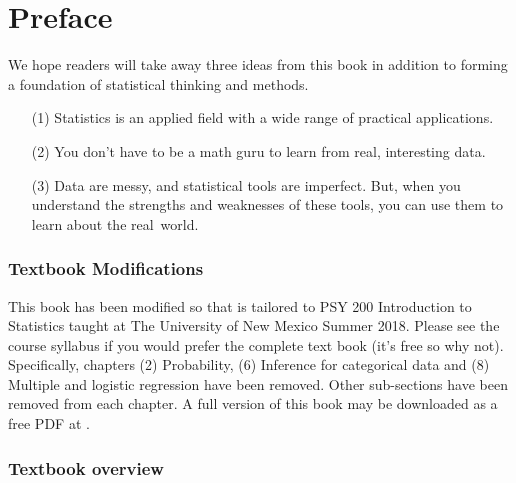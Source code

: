 \chapter*{Preface}

\noindent We hope readers will take away three ideas from this book in addition to forming a foundation of statistical thinking and methods.\vspace{-1mm}
\begin{enumerate}
\setlength{\itemsep}{0mm}
\item[(1)] Statistics is an applied field with a wide range of practical applications.
\item[(2)] You don't have to be a math guru to learn from real, interesting data.
\item[(3)] Data are messy, and statistical tools are imperfect. But, when you understand the strengths and weaknesses of these tools, you can use them to learn about the real~world.
\end{enumerate}

\subsection*{Textbook Modifications}
This book has been modified so that is tailored to PSY 200 Introduction to Statistics taught at The University of New Mexico Summer 2018. Please see the course syllabus if you would prefer the complete text book (it's free so why not). Specifically, chapters (2) Probability, (6) Inference for categorical data and (8) Multiple and logistic regression have been removed.  Other  sub-sections have been removed from each chapter. A full version of this book may be downloaded as a free PDF at . \vspace{3mm}

\subsection*{Textbook overview}

